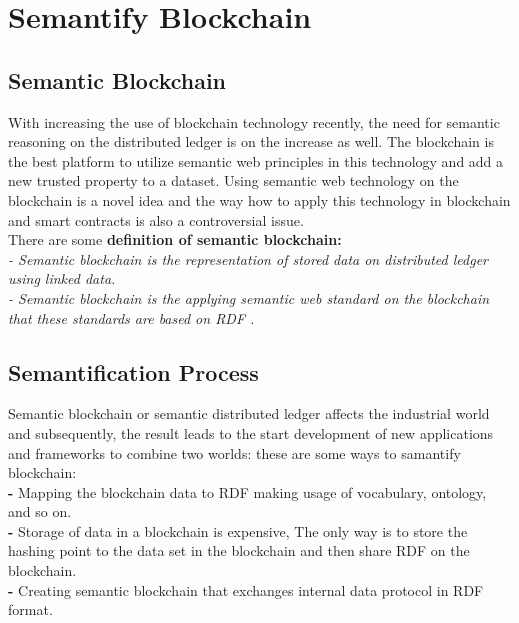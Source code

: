 \section{Semantify Blockchain}
\subsection{Semantic Blockchain}
With increasing the use of blockchain technology recently, the need for semantic reasoning on the distributed ledger is on the increase as well. The blockchain is the best platform to utilize semantic web principles in this technology and add a new trusted property to a dataset. 
Using semantic web technology on the blockchain is a novel idea and the way how to apply this technology in blockchain and smart contracts is also a controversial issue.\\
There are some \textbf{definition of semantic blockchain:}\\ 
\textit{- Semantic blockchain is the representation of stored data on distributed ledger using linked data. }\\
\textit{- Semantic blockchain is the applying semantic web standard on the blockchain that these standards are based on RDF \cite{Hector}.}

\subsection{Semantification Process}
Semantic blockchain or semantic distributed ledger affects the industrial world and subsequently, the result leads to the start development of new applications and frameworks to combine two worlds:
these are some ways to samantify blockchain:\\
\textbf{-} Mapping the blockchain data to RDF making usage of vocabulary, ontology, and so on.\\
\textbf{-} Storage of data in a blockchain is expensive, The only way is to store the hashing point to the data set in the blockchain and then share RDF on the blockchain. \\
\textbf{-} Creating semantic blockchain that exchanges internal data protocol in RDF format\cite{Hector}. \\

